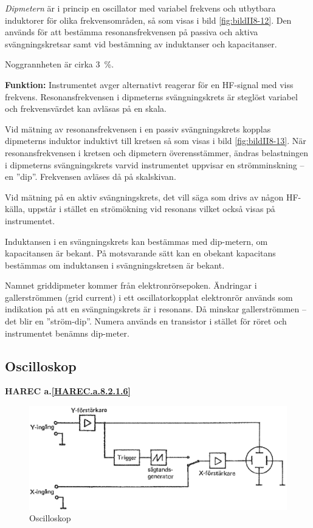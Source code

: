\emph{Dipmetern} är i princip en oscillator med variabel frekvens och
utbytbara induktorer för olika frekvensområden, så som visas i bild
\ref{fig:bildII8-12}.
Den används för att bestämma resonansfrekvensen på passiva och aktiva
svängningskretsar samt vid bestämning av induktanser och kapacitanser.

Noggrannheten är cirka 3~\%.

\textbf{Funktion:}
Instrumentet avger alternativt reagerar för en HF-signal med viss frekvens.
Resonansfrekvensen i dipmeterns svängningskrets är steglöst variabel och
frekvensvärdet kan avläsas på en skala.

Vid mätning av resonansfrekvensen i en passiv svängningskrets kopplas
dipmeterns induktor induktivt till kretsen så som visas i bild
\ref{fig:bildII8-13}.
När resonansfrekvensen i kretsen och dipmetern överensstämmer, ändras
belastningen i dipmeterns svängningskrets varvid instrumentet uppvisar en
strömminskning -- en ''dip''.
Frekvensen avläses då på skalskivan.

Vid mätning på en aktiv svängningskrets, det vill säga som drivs av någon
HF-källa, uppstår i stället en strömökning vid resonans vilket också visas på
instrumentet.

Induktansen i en svängningskrets kan bestämmas med dip-metern, om kapacitansen
är bekant.
På motsvarande sätt kan en obekant kapacitans bestämmas om induktansen i
svängningskretsen är bekant.

Namnet griddipmeter kommer från elektronrörsepoken.
Ändringar i gallerströmmen (grid current) i ett oscillatorkopplat elektronrör
används som indikation på att en svängningskrets är i resonans.
Då minskar gallerströmmen -- det blir en ''ström-dip''.
Numera används en transistor i stället för röret och instrumentet benämns
dip-meter.

\subsection{Oscilloskop}
\textbf{
HAREC a.\ref{HAREC.a.8.2.1.6}\label{myHAREC.a.8.2.1.6}
}

\begin{figure}
  \includegraphics[width=\textwidth]{images/cropped_pdfs/bild_2_8-14.pdf}
  \caption{Oscilloskop}
  \label{fig:bildII8-14}
\end{figure}

